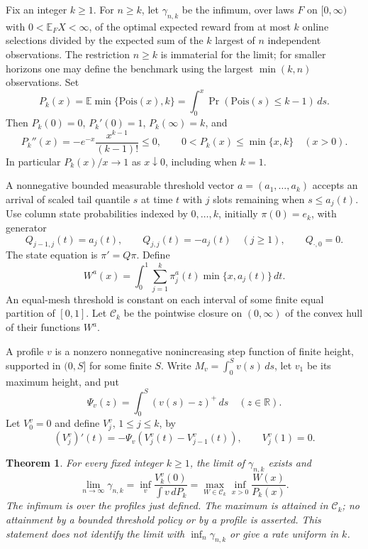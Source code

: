 \documentclass[11pt]{article}
\newtheorem{theorem}{Theorem}
\theoremstyle{remark}
\begin{document}
Fix an integer $k\ge1$. For $n\ge k$, let $\gamma_{n,k}$ be the
infimum, over laws $F$ on $[0,\infty)$ with $0<\mathbb E_F X<\infty$,
of the optimal expected reward from at most $k$ online selections divided
by the expected sum of the $k$ largest of $n$ independent observations.
The restriction $n\ge k$ is immaterial for the limit; for smaller horizons
one may define the benchmark using the largest $\min(k,n)$ observations.
Set
\[
 P_k(x)=\mathbb E\min\{\mathrm{Pois}(x),k\}
       =\int_0^x\Pr(\mathrm{Pois}(s)\le k-1)\,ds.
\]
Then $P_k(0)=0$, $P_k'(0)=1$, $P_k(\infty)=k$, and
\[
 P_k''(x)=-e^{-x}\frac{x^{k-1}}{(k-1)!}\le0,
 \qquad 0<P_k(x)\le\min\{x,k\}\quad(x>0).
\]
In particular $P_k(x)/x\to1$ as $x\downarrow0$, including when $k=1$.

A nonnegative bounded measurable threshold vector $a=(a_1,\ldots,a_k)$ accepts an
arrival of scaled tail quantile $s$ at time $t$ with $j$ slots remaining
when $s\le a_j(t)$. Use column state probabilities indexed by
$0,\ldots,k$, initially $\pi(0)=e_k$, with generator
\[
 Q_{j-1,j}(t)=a_j(t),\qquad Q_{j,j}(t)=-a_j(t)\quad(j\ge1),
 \qquad Q_{\cdot,0}=0.
\]
The state equation is $\pi'=Q\pi$. Define
\[
 W^a(x)=\int_0^1\sum_{j=1}^k\pi_j^a(t)\min\{x,a_j(t)\}\,dt.
\]
An equal-mesh threshold is constant on each interval of some finite
equal partition of $[0,1]$. Let $\mathcal C_k$ be the pointwise closure
on $(0,\infty)$ of the convex hull of their functions $W^a$.

A profile $v$ is a nonzero nonnegative nonincreasing step function of
finite height, supported in $(0,S]$ for some finite $S$. Write
$M_v=\int_0^S v(s)\,ds$, let $v_1$ be its maximum height, and put
\[
 \Psi_v(z)=\int_0^S(v(s)-z)^+\,ds\quad(z\in\mathbb R).
\]
Let $V_0^v=0$ and define $V_j^v$, $1\le j\le k$, by
\begin{equation}\label{eq:general-k-values}
 (V_j^v)'(t)=-\Psi_v(V_j^v(t)-V_{j-1}^v(t)),
 \qquad V_j^v(1)=0.
\end{equation}

\begin{theorem}\label{thm:general-k-game}
For every fixed integer $k\ge1$, the limit of $\gamma_{n,k}$ exists and
\[
 \lim_{n\to\infty}\gamma_{n,k}
 =\inf_{v}\frac{V_k^v(0)}{\int v\,dP_k}
 =\max_{W\in\mathcal C_k}\inf_{x>0}\frac{W(x)}{P_k(x)}.
\]
The infimum is over the profiles just defined. The maximum is attained
in $\mathcal C_k$; no attainment by a bounded threshold policy or by a
profile is asserted. This statement does not identify the limit with
$\inf_n\gamma_{n,k}$ or give a rate uniform in $k$.
\end{theorem}
\end{document}
